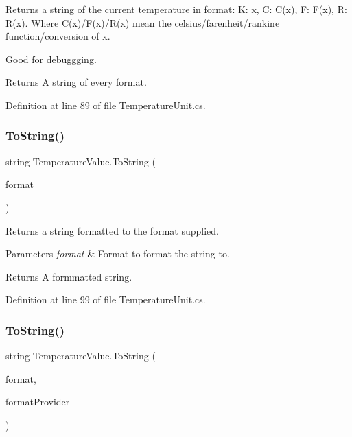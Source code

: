 Returns a string of the current temperature in format\+: K\+: x, C\+: C(x), F\+: F(x), R\+: R(x). Where C(x)/F(x)/R(x) mean the celsius/farenheit/rankine function/conversion of x. 

Good for debuggging. 

\begin{DoxyReturn}{Returns}
A string of every format. 
\end{DoxyReturn}


Definition at line 89 of file Temperature\+Unit.\+cs.

\mbox{\label{struct_temperature_value_a2ef953e39514eea9cc65261393484d68}} 
\subsubsection{\texorpdfstring{To\+String()}{ToString()}\hspace{0.1cm}{\footnotesize\ttfamily [2/3]}}
{\footnotesize\ttfamily string Temperature\+Value.\+To\+String (\begin{DoxyParamCaption}\item[{string}]{format }\end{DoxyParamCaption})}



Returns a string formatted to the format supplied. 


\begin{DoxyParams}{Parameters}
{\em format} & Format to format the string to. \\
\hline
\end{DoxyParams}
\begin{DoxyReturn}{Returns}
A formmatted string. 
\end{DoxyReturn}


Definition at line 99 of file Temperature\+Unit.\+cs.

\mbox{\label{struct_temperature_value_a69b048929bb1c0623170b623e9b1f052}} 
\subsubsection{\texorpdfstring{To\+String()}{ToString()}\hspace{0.1cm}{\footnotesize\ttfamily [3/3]}}
{\footnotesize\ttfamily string Temperature\+Value.\+To\+String (\begin{DoxyParamCaption}\item[{string}]{format,  }\item[{I\+Format\+Provider}]{format\+Provider }\end{DoxyParamCaption})}



